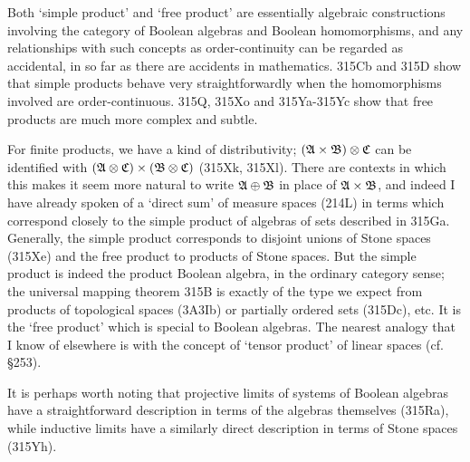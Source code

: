 {Both `simple product' and `free product' are essentially algebraic
constructions involving the category of Boolean algebras and Boolean
homomorphisms, and any relationships with such concepts as
order-continuity can be regarded as accidental, in so far as there are
accidents in mathematics.   315Cb and 315D show
that simple products behave very straightforwardly when the
homomorphisms involved are order-continuous.   315Q, 315Xo and
315Ya-315Yc show that free products are much more complex and subtle.

For finite products, we have a kind of distributivity;
$(\frak A\times\frak B)\otimes\frak C$ can be identified with
$(\frak A\otimes\frak C)\times(\frak B\otimes\frak C)$ (315Xk, 315Xl).
There are contexts in which this makes it seem more natural to write
$\frak A\oplus\frak B$ in place of $\frak A\times\frak B$, and indeed I
have already spoken of a `direct sum' of measure spaces (214L) in terms
which correspond closely to the simple product of algebras of sets
described
in 315Ga.   Generally, the simple product corresponds to disjoint unions
of Stone spaces (315Xe) and the free product to products of Stone
spaces.   But the simple product is indeed the product Boolean algebra,
in the ordinary category sense;  the universal mapping theorem 315B is
exactly of the type we expect from products of topological spaces
(3A3Ib) or partially ordered sets (315Dc), etc.   It is the `free
product' which is special to Boolean algebras.   The nearest analogy
that I know
of elsewhere is with the concept of `tensor product' of linear spaces
(cf. \S253).

It is perhaps worth noting that projective limits of systems of Boolean
algebras have a straightforward description in terms of the algebras
themselves (315Ra), while
inductive limits have a similarly direct description in terms of Stone
spaces (315Yh).
}%

\discrpage

